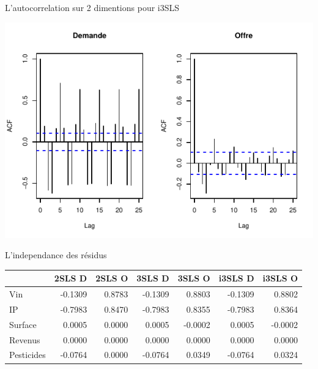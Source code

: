 \documentclass[11pt,ignorenonframetext,]{beamer}
\begin{document}
\begin{frame}{L'autocorrelation sur 2 dimentions pour i3SLS}
\protect\hypertarget{lautocorrelation-sur-2-dimentions-pour-i3sls}{}

\tiny

\begin{center}\includegraphics{Presentation_files/figure-beamer/unnamed-chunk-64-1} \end{center}

\normalsize

\end{frame}

\begin{frame}{L'independance des résidus}
\protect\hypertarget{lindependance-des-residus}{}

\tiny

\begin{longtable}[]{@{}lrrrrrr@{}}
\toprule
& 2SLS D & 2SLS O & 3SLS D & 3SLS O & i3SLS D & i3SLS O\tabularnewline
\midrule
\endhead
Vin & -0.1309 & 0.8783 & -0.1309 & 0.8803 & -0.1309 &
0.8802\tabularnewline
IP & -0.7983 & 0.8470 & -0.7983 & 0.8355 & -0.7983 &
0.8364\tabularnewline
Surface & 0.0005 & 0.0000 & 0.0005 & -0.0002 & 0.0005 &
-0.0002\tabularnewline
Revenus & 0.0000 & 0.0000 & 0.0000 & 0.0000 & 0.0000 &
0.0000\tabularnewline
Pesticides & -0.0764 & 0.0000 & -0.0764 & 0.0349 & -0.0764 &
0.0324\tabularnewline
\bottomrule
\end{longtable}

\normalsize

\end{frame}
\end{document}
